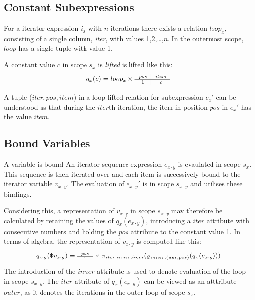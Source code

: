 \subsection{Constant Subexpressions}
\label{sect:translation:ll:ConstExprs}

For a iterator expression $i_{x}$ with $n$ iterations there exists a relation $loop_{x}$, consisting of a
single column, \textit{iter}, with values 1,2,\ldots,$n$. In the outermost scope, $loop$ has a single tuple with
value 1.

A constant value $c$ in scope $s_{x}$ is \textit{lifted} is lifted like this:
\begin{equation}
q_{x}(c) =  loop_{x} \times \mbox{\scriptsize \begin{tabular}{c|c} \textit{pos}&\textit{item} \\
\hline 1 & \textit{c}
\end{tabular}}
\label{eq:ll:constLoopLift}
\end{equation}

A tuple ($iter,pos,item$) in a loop lifted relation for subexpression $e_{x}'$ can be understood as that during the
$iter$th iteration, the item in position $pos$ in $e_{x}'$ has the value $item$.

\subsection{Bound Variables}
\label{sect:translation:ll:boundVar}

A variable is bound
An iterator sequence expression $e_{x \cdot y}$ is evaulated in scope $s_{x}$. This sequence is then iterated over
and each item is successively bound to the iterator variable $v_{x \cdot y}$. The evaluation of $e_{x \cdot y}'$
is in scope $s_{x \cdot y}$ and utilises these bindings. 

Considering this, a representation of $v_{x \cdot y}$ in scope $s_{x \cdot y}$ may therefore be calculated by
retaining the values of $q_{x}(e_{x \cdot y})$, introducing a $iter$ attribute with consecutive numbers and
holding the $pos$ attribute to the constant value 1. In terms of algebra, the representation of $v_{x \cdot y}$ is
computed like this:
\begin{equation}
q_{x \cdot y}(\mbox{\texttt{\$}}v_{x \cdot y}) = \mbox{\scriptsize \begin{tabular}{c} $pos$ \\\hline 1
\end{tabular}} \times \pi_{iter:inner,item}(\varrho_{inner:(iter,pos)}(q_{x}(e_{x \cdot y})))
\label{eq:ll:qxy_vxy}
\end{equation}
The introduction of the $inner$ attribute is used to denote evaluation of the loop in scope $s_{x \cdot y}$. The
$iter$ attribute of $q_{x}(e_{x \cdot y})$ can be viewed as an atttribute $outer$, as it denotes the iterations in
the outer loop of scope $s_{x}$.

